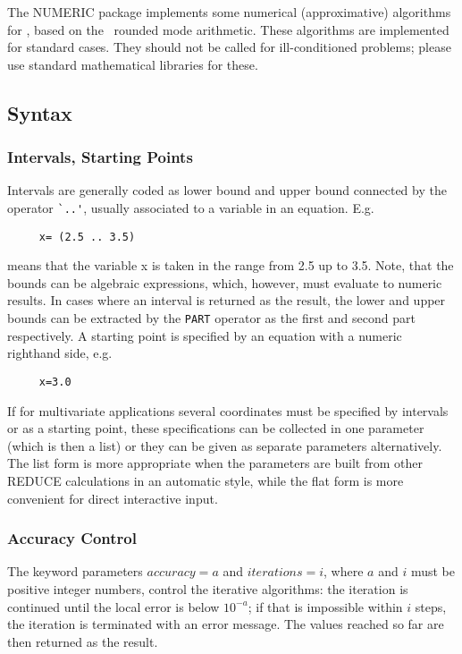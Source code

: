 
The {\small NUMERIC} package implements some numerical (approximative)
algorithms for \REDUCE, based on the \REDUCE\ rounded mode
arithmetic. These algorithms are implemented for standard cases.
They should not be called for ill-conditioned problems;
please use standard mathematical libraries for these.

\subsection{Syntax}

\subsubsection{Intervals, Starting Points}

Intervals are generally coded as lower bound and
upper bound connected by the operator \verb+`..'+, usually
associated to a variable in an
equation. E.g.
\begin{verbatim}
     x= (2.5 .. 3.5)
\end{verbatim}
means that the variable x is taken in the range from 2.5 up to
3.5. Note, that the bounds can be algebraic
expressions, which, however, must evaluate to numeric results.
In cases where an interval is returned as the result, the lower
and upper bounds can be extracted by the \verb+PART+ operator
as the first and second part respectively.
A starting point is specified by an equation with a numeric
righthand side, e.g.
\begin{verbatim}
     x=3.0
\end{verbatim}
If for multivariate applications several coordinates must be
specified by intervals or as a starting point, these
specifications can be collected in one parameter (which is then
a list) or they can be given as separate parameters
alternatively. The list form is more appropriate when the
parameters are built from other REDUCE calculations in an
automatic style, while the flat form is more convenient
for direct interactive input.

\subsubsection{Accuracy Control}

The keyword parameters $accuracy=a$ and $iterations=i$, where
$a$ and $i$ must be positive integer numbers, control the
iterative algorithms: the iteration is continued until
the local error is below $10^{-a}$; if that is impossible
within $i$ steps, the iteration is terminated with an
error message. The values reached so far are then returned
as the result.

